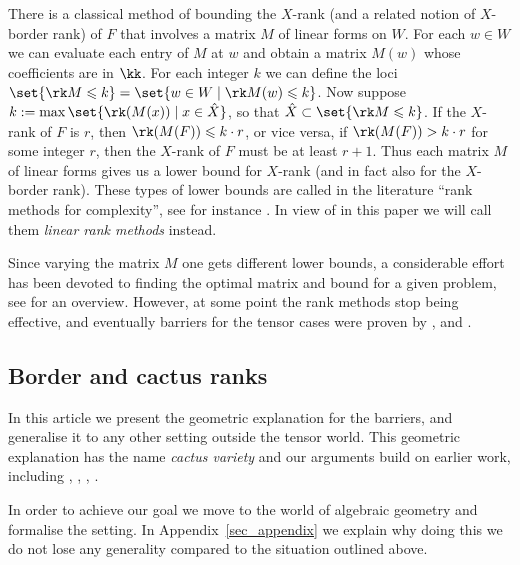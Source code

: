 \documentclass[12pt,a4paper]{article}
\begin{document}
There is a classical method of bounding the $X$-rank (and a related notion of $X$-border rank) of $F$ that involves a matrix $M$ of linear forms on $W$.
For each $w\in W$ we can evaluate each entry of $M$ at $w$ and obtain a matrix $M(w)$ whose coefficients are in $\kk$.
For each integer $k$ we can define the loci $\set{\rk M\leqslant k}=\set{w\in W \mid \rk M(w) \leqslant k}$.
Now suppose $k:= \max\set{ \rk(M(x)) \mid x\in \hat{X}}$, so that $\hat X\subset \set{\rk M\leqslant k}$.
If the $X$-rank of $F$ is $r$, then $\rk(M(F))\leqslant k \cdot r$, or vice versa, if $\rk(M(F))> k \cdot r$ for some integer $r$, then the $X$-rank of $F$ must be at least $r+1$.
Thus each matrix $M$ of linear forms gives us a lower bound for $X$-rank (and in fact also for the $X$-border rank).
These types of lower bounds are called in the literature ``rank methods for complexity'', see for instance \cite{efremenko_garg_oliveira_wigderson_barriers_for_rank_methods}.
In view of \cite{dolezalek_michalek_nonlinear_methods_for_tensors_det_eq_for_secants}
 in this paper we will call them \emph{linear rank methods} instead.

Since varying the matrix $M$ one gets different lower bounds,
a considerable effort has been devoted to finding the optimal matrix and bound for a given problem, see \cite{landsberg_ottaviani_VB_method_equ_for_secants} for an overview.
However, at some point the rank methods stop being effective,
and eventually barriers for the tensor cases were proven by \cite{efremenko_garg_oliveira_wigderson_barriers_for_rank_methods},
and \cite{garg_makam_oliveira_wigderson_more_barriers_for_rank_methods}.

\subsection{Border and cactus ranks}
\label{sec_intro_borders_and_cacti}

In this  article we present the geometric explanation for the barriers,
and generalise it to any other setting outside  the tensor world.
This geometric explanation has the name \emph{cactus variety} and our arguments build on earlier work, including \cite{nisiabu_jabu_cactus},
\cite{bernardi_ranestad_cactus_rank_of_cubics},
\cite{galazka_mgr_publ}
\cite{galazka_vb_cactus},
\cite{galazka_phd}.


In order to achieve our goal we move to the world of algebraic geometry and formalise the setting.
In Appendix~\ref{sec_appendix} we explain why doing this we do not lose any generality compared to the situation outlined above.
\end{document}
